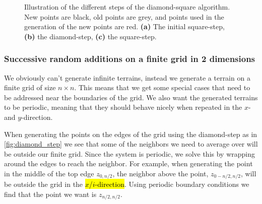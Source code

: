 \begin{figure}
    \caption{
        Illustration of the different steps of the diamond-square algorithm. New points are black, old points are grey, and points used in the generation of the new points are red.
        {\bf (a)} The initial square-step,
        {\bf (b)} the diamond-step,
        {\bf (c)} the square-step.
        \label{fig:diamond_square}
    }
\end{figure}

\subsubsection{Successive random additions on a finite grid in 2 dimensions}
We obviously can't generate infinite terrains, instead we generate a terrain on a finite grid of size $n\times n$. This means that we get some special cases that need to be addressed near the boundaries of the grid. We also want the generated terrains to be periodic, meaning that they should behave nicely when repeated in the $x$- and $y$-direction. 

When generating the points on the edges of the grid using the diamond-step as in \cref{fig:diamond_step} we see that some of the neighbors we need to average over will be outside our finite grid. Since the system is periodic, we solve this by wrapping around the edges to reach the neighbor. For example, when generating the point in the middle of the top edge $z_{0, n/2}$, the neighbor above the point, $z_{0-n/2, n/2}$, will be outside the grid in the \hl{$x$/$i$-direction}. Using periodic boundary conditions we find that the point we want is $z_{n/2, n/2}$.

